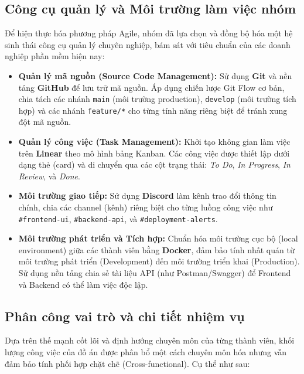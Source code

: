 \subsection{Công cụ quản lý và Môi trường làm việc nhóm}

Để hiện thực hóa phương pháp Agile, nhóm đã lựa chọn và đồng bộ hóa một hệ sinh thái công cụ quản lý chuyên nghiệp, bám sát với tiêu chuẩn của các doanh nghiệp phần mềm hiện nay:

\begin{itemize}
    \item \textbf{Quản lý mã nguồn (Source Code Management):} Sử dụng \textbf{Git} và nền tảng \textbf{GitHub} để lưu trữ mã nguồn. Áp dụng chiến lược Git Flow cơ bản, chia tách các nhánh \texttt{main} (môi trường production), \texttt{develop} (môi trường tích hợp) và các nhánh \texttt{feature/*} cho từng tính năng riêng biệt để tránh xung đột mã nguồn.
    \item \textbf{Quản lý công việc (Task Management):} Khởi tạo không gian làm việc trên \textbf{Linear} theo mô hình bảng Kanban. Các công việc được thiết lập dưới dạng thẻ (card) và di chuyển qua các cột trạng thái: \textit{To Do}, \textit{In Progress}, \textit{In Review}, và \textit{Done}.
    \item \textbf{Môi trường giao tiếp:} Sử dụng \textbf{Discord} làm kênh trao đổi thông tin chính, chia các channel (kênh) riêng biệt cho từng luồng công việc như \texttt{\#frontend-ui}, \texttt{\#backend-api}, và \texttt{\#deployment-alerts}.
    \item \textbf{Môi trường phát triển và Tích hợp:} Chuẩn hóa môi trường cục bộ (local environment) giữa các thành viên bằng \textbf{Docker}, đảm bảo tính nhất quán từ môi trường phát triển (Development) đến môi trường triển khai (Production). Sử dụng nền tảng chia sẻ tài liệu API (như Postman/Swagger) để Frontend và Backend có thể làm việc độc lập.
\end{itemize}

\subsection{Phân công vai trò và chi tiết nhiệm vụ}

Dựa trên thế mạnh cốt lõi và định hướng chuyên môn của từng thành viên, khối lượng công việc của đồ án được phân bổ một cách chuyên môn hóa nhưng vẫn đảm bảo tính phối hợp chặt chẽ (Cross-functional). Cụ thể như sau:

